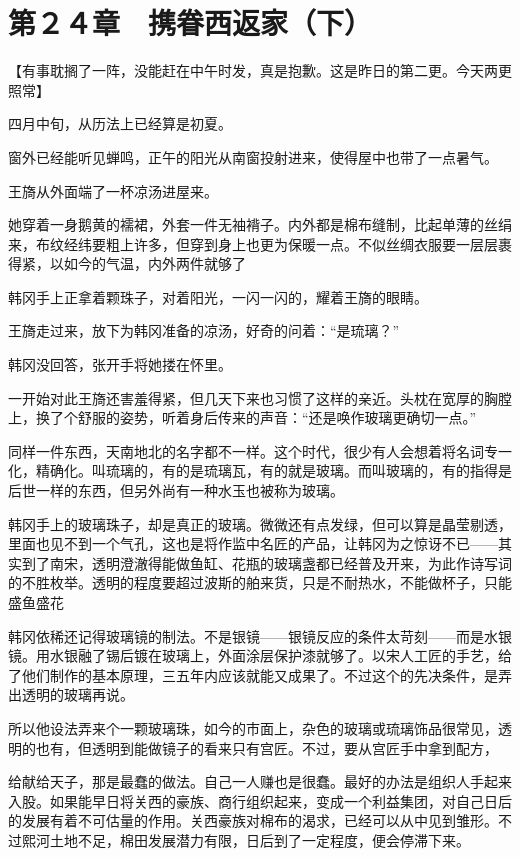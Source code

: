 \section{第２４章　携眷西返家（下）}

【有事耽搁了一阵，没能赶在中午时发，真是抱歉。这是昨日的第二更。今天两更照常】

四月中旬，从历法上已经算是初夏。

窗外已经能听见蝉鸣，正午的阳光从南窗投射进来，使得屋中也带了一点暑气。

王旖从外面端了一杯凉汤进屋来。

她穿着一身鹅黄的襦裙，外套一件无袖褙子。内外都是棉布缝制，比起单薄的丝绢来，布纹经纬要粗上许多，但穿到身上也更为保暖一点。不似丝绸衣服要一层层裹得紧，以如今的气温，内外两件就够了

韩冈手上正拿着颗珠子，对着阳光，一闪一闪的，耀着王旖的眼睛。

王旖走过来，放下为韩冈准备的凉汤，好奇的问着：“是琉璃？”

韩冈没回答，张开手将她搂在怀里。

一开始对此王旖还害羞得紧，但几天下来也习惯了这样的亲近。头枕在宽厚的胸膛上，换了个舒服的姿势，听着身后传来的声音：“还是唤作玻璃更确切一点。”

同样一件东西，天南地北的名字都不一样。这个时代，很少有人会想着将名词专一化，精确化。叫琉璃的，有的是琉璃瓦，有的就是玻璃。而叫玻璃的，有的指得是后世一样的东西，但另外尚有一种水玉也被称为玻璃。

韩冈手上的玻璃珠子，却是真正的玻璃。微微还有点发绿，但可以算是晶莹剔透，里面也见不到一个气孔，这也是将作监中名匠的产品，让韩冈为之惊讶不已——其实到了南宋，透明澄澈得能做鱼缸、花瓶的玻璃盏都已经普及开来，为此作诗写词的不胜枚举。透明的程度要超过波斯的舶来货，只是不耐热水，不能做杯子，只能盛鱼盛花

韩冈依稀还记得玻璃镜的制法。不是银镜——银镜反应的条件太苛刻——而是水银镜。用水银融了锡后镀在玻璃上，外面涂层保护漆就够了。以宋人工匠的手艺，给了他们制作的基本原理，三五年内应该就能又成果了。不过这个的先决条件，是弄出透明的玻璃再说。

所以他设法弄来个一颗玻璃珠，如今的市面上，杂色的玻璃或琉璃饰品很常见，透明的也有，但透明到能做镜子的看来只有宫匠。不过，要从宫匠手中拿到配方，

给献给天子，那是最蠢的做法。自己一人赚也是很蠢。最好的办法是组织人手起来入股。如果能早日将关西的豪族、商行组织起来，变成一个利益集团，对自己日后的发展有着不可估量的作用。关西豪族对棉布的渴求，已经可以从中见到雏形。不过熙河土地不足，棉田发展潜力有限，日后到了一定程度，便会停滞下来。

